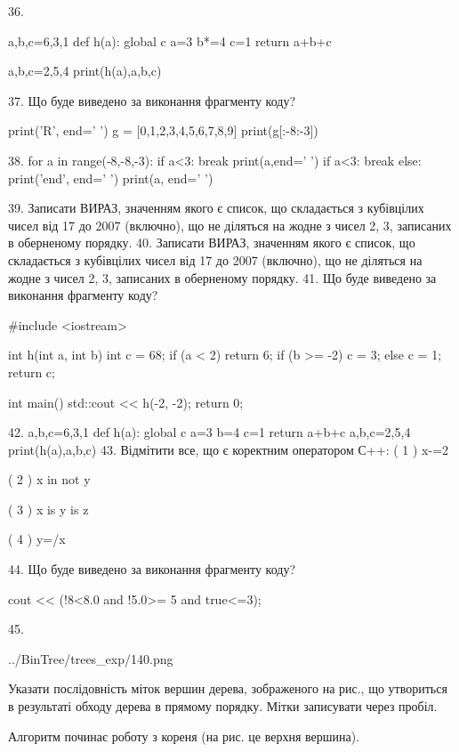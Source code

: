 \documentclass[11pt]{article}
\begin{document}
36. 

a,b,c=6,3,1
def h(a):
global c    a=3
    b*=4
    c=1
    return a+b+c

a,b,c=2,5,4
print(h(a),a,b,c)

37. Що буде виведено за виконання фрагменту коду?

print('R', end=' ')
g = [0,1,2,3,4,5,6,7,8,9]
print(g[:-8:-3])


38. 
for a in range(-8,-8,-3):
    if a<3:
        break
        print(a,end=' ')
    if a<3:
        break
else:
    print('end', end=' ')
print(a, end=' ')

39. 
Записати ВИРАЗ, значенням якого є список, що складається з кубівцілих чисел від 17 до 2007 (включно), що не діляться на жодне з чисел 2, 3, записаних в оберненому порядку.
40. 
Записати ВИРАЗ, значенням якого є список, що складається з кубівцілих чисел від 17 до 2007 (включно), що не діляться на жодне з чисел 2, 3, записаних в оберненому порядку.
41. Що буде виведено за виконання фрагменту коду?

#include <iostream>

int h(int a, int b){
    int c = 68;
    if (a < 2)
        return 6;
    if (b >= -2)
         c = 3;
    else 
        c = 1;
    return c;
}

int main(){
    std::cout << h(-2, -2);
    return 0;
}

42. 
a,b,c=6,3,1
    def h(a):
      global c      a=3
      b=4
      c=1
      return a+b+c
    a,b,c=2,5,4
    print(h(a),a,b,c)
43. %
Відмітити все, що є коректним оператором С++:
( 1 ) x-=2

( 2 ) x in not y

( 3 ) x is y is z

( 4 ) y=/x

44. Що буде виведено за виконання фрагменту коду?

cout << (!8<8.0 and !5.0>= 5 and true<=3);

45. 

\begin{center}
	{../BinTree/trees_exp/140.png}
\end{center}
Указати послідовність міток вершин дерева, зображеного на рис., що утвориться в результаті обходу дерева в прямому порядку. Мітки записувати через пробіл.\par Алгоритм починає роботу з кореня (на рис. це верхня вершина).
\end{document}
